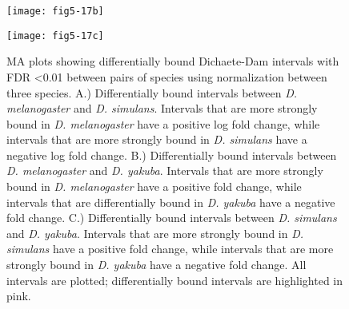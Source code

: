 \begin{figure}[H]
\centering
\texttt{[image: fig5-17b]}
\label{Figure 5.17}
\end{figure}

\begin{figure}[H]
\centering
\texttt{[image: fig5-17c]}
\caption{MA plots showing differentially bound Dichaete-Dam intervals with FDR \textless 0.01 between pairs of species using normalization between three species. A.) Differentially bound intervals between \emph{D. melanogaster} and \emph{D. simulans}. Intervals that are more strongly bound in \emph{D. melanogaster} have a positive log fold change, while intervals that are more strongly bound in \emph{D. simulans} have a negative log fold change. B.) Differentially bound intervals between \emph{D. melanogaster} and \emph{D. yakuba}. Intervals that are more strongly bound in \emph{D. melanogaster} have a positive fold change, while intervals that are differentially bound in \emph{D. yakuba} have a negative fold change. C.) Differentially bound intervals between \emph{D. simulans} and \emph{D. yakuba}. Intervals that are more strongly bound in \emph{D. simulans} have a positive fold change, while intervals that are more strongly bound in \emph{D. yakuba} have a negative fold change. All intervals are plotted; differentially bound intervals are highlighted in pink.}
\label{Figure 5.17}
\end{figure}


